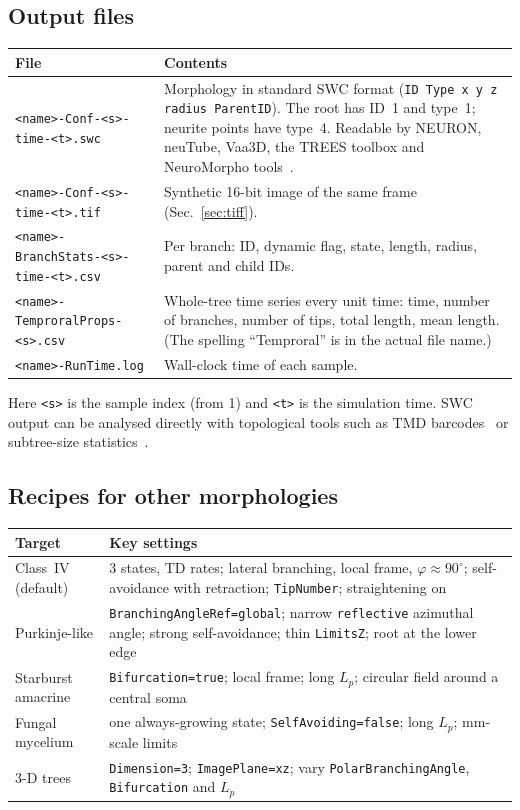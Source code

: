 \documentclass[11pt,a4paper]{article}
\newcommand{\code}[1]{\texttt{#1}}
\begin{document}
\subsection{Output files}
\begin{center}\small
\begin{tabularx}{\textwidth}{@{}p{5.3cm}X@{}}
\toprule
\textbf{File} & \textbf{Contents}\\ \midrule
\code{<name>-Conf-<s>-time-<t>.swc} & Morphology in standard SWC format (\code{ID Type x y z radius ParentID}). The root has ID~1 and type~1; neurite points have type~4. Readable by NEURON, neuTube, Vaa3D, the TREES toolbox and NeuroMorpho tools~\cite{Ascoli2007}.\\
\code{<name>-Conf-<s>-time-<t>.tif} & Synthetic 16-bit image of the same frame (Sec.~\ref{sec:tiff}).\\
\code{<name>-BranchStats-<s>-time-<t>.csv} & Per branch: ID, dynamic flag, state, length, radius, parent and child IDs.\\
\code{<name>-TemproralProps-<s>.csv} & Whole-tree time series every unit time: time, number of branches, number of tips, total length, mean length. (The spelling ``Temproral'' is in the actual file name.)\\
\code{<name>-RunTime.log} & Wall-clock time of each sample.\\
\bottomrule
\end{tabularx}
\end{center}
Here \code{<s>} is the sample index (from 1) and \code{<t>} is the simulation time. SWC output can be analysed directly with topological tools such as TMD barcodes~\cite{Kanari2018} or subtree-size statistics~\cite{Liao2023}.

\subsection{Recipes for other morphologies}
\begin{center}\small
\begin{tabularx}{\textwidth}{@{}p{3.6cm}X@{}}
\toprule
\textbf{Target} & \textbf{Key settings}\\ \midrule
Class~IV (default) & 3 states, TD rates; lateral branching, local frame, $\varphi\approx90^\circ$; self-avoidance with retraction; \code{TipNumber}; straightening on\\
Purkinje-like & \code{BranchingAngleRef=global}; narrow \code{reflective} azimuthal angle; strong self-avoidance; thin \code{LimitsZ}; root at the lower edge\\
Starburst amacrine & \code{Bifurcation=true}; local frame; long $L_p$; circular field around a central soma\\
Fungal mycelium & one always-growing state; \code{SelfAvoiding=false}; long $L_p$; mm-scale limits\\
3-D trees & \code{Dimension=3}; \code{ImagePlane=xz}; vary \code{PolarBranchingAngle}, \code{Bifurcation} and $L_p$\\
\bottomrule
\end{tabularx}
\end{center}
\end{document}
